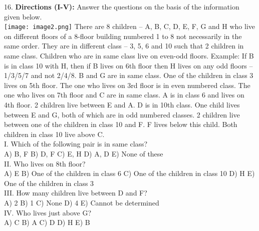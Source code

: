 \documentclass[
]{article}
\begin{document}
16. \textbf{Directions (I-V):} Answer the questions on the basis of the information given below.\\
\texttt{[image: image2.png]}
There are 8 children – A, B, C, D, E, F, G and H who live on different floors of a 8-floor
building numbered 1 to 8 not necessarily in the same order. They are in different class – 3, 5,
6 and 10 such that 2 children in same class. Children who are in same class live on even-odd
floors. Example: If B is in class 10 with H, then if B lives on 6th floor then H lives on any odd
floors – 1/3/5/7 and not 2/4/8. B and G are in same class. One of the children in class 3 lives
on 5th floor. The one who lives on 3rd floor is in even numbered class. The one who lives on
7th floor and C are in same class. A is in class 6 and lives on 4th floor. 2 children live
between E and A. D is in 10th class. One child lives between E and G, both of which are in
odd numbered classes. 2 children live between one of the children in class 10 and F. F lives
below this child. Both children in class 10 live above C.\\

I. Which of the following pair is in same class?\\
A) B, F \hspace{2mm}B) D, F \hspace{2mm}C) E, H \hspace{2mm}D) A, D \hspace{2mm}E) None of these\\

II. Who lives on 8th floor?\\
A) E \hspace{2mm}B) One of the children in class 6
\hspace{2mm}C) One of the children in class 10 \hspace{2mm}D) H
\hspace{2mm}E) One of the children in class 3\\

III. How many children live between D and F?\\
A) 2 \hspace{2mm}B) 1 \hspace{2mm}C) None \hspace{2mm}D) 4 \hspace{2mm}E) Cannot be determined\\

IV. Who lives just above G?\\
A) C \hspace{2mm}B) A \hspace{2mm}C) D \hspace{2mm}D) H \hspace{2mm}E) B\\
\end{document}

